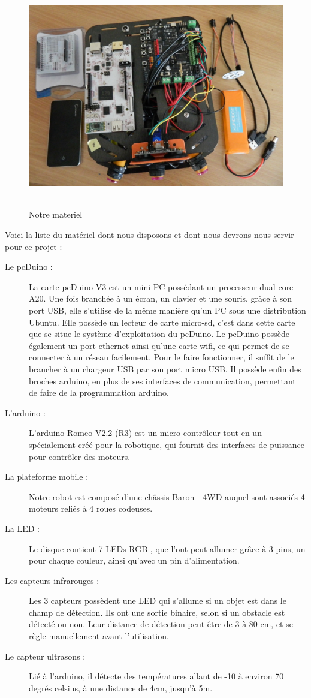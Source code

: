 \documentclass[12pt,francais]{report}
\begin{document}
\begin{figure}[!h]
\includegraphics[scale=0.4]{./images/notre_materiel.jpg}~\
\caption{Notre materiel}
\end{figure}
	
Voici la liste du matériel dont nous disposons et dont nous devrons nous servir pour ce projet :

\begin{description}
\item [Le pcDuino :] La carte pcDuino V3 est un mini PC possédant un processeur dual core A20. Une fois branchée à un écran, un clavier et une souris, grâce à son port USB, elle s'utilise de la même manière qu'un PC sous une distribution Ubuntu. Elle possède un lecteur de carte micro-sd,  c'est dans cette carte que se situe le système d'exploitation du pcDuino. Le pcDuino possède également un port ethernet ainsi qu'une carte wifi, ce qui permet de se connecter à un réseau facilement. Pour le faire fonctionner, il suffit de le brancher à un chargeur USB par son port micro USB. Il possède enfin des broches arduino, en plus de ses interfaces de communication, permettant de faire de la programmation arduino.\cite{ref3}
\item [L'arduino :] L'arduino Romeo V2.2 (R3) \cite{ref4} est un micro-contrôleur tout en un spécialement créé pour la robotique, qui fournit des interfaces de puissance pour contrôler des moteurs.
\item [La plateforme mobile :] Notre robot est composé d'une châssis Baron - 4WD auquel sont associés 4 moteurs reliés à 4 roues codeuses. \cite{ref5}
\item [La LED :] Le disque contient 7 LEDs RGB \cite{ref6}, que l'ont peut allumer grâce à 3 pins, un pour chaque couleur, ainsi qu'avec un pin d'alimentation.
\item [Les capteurs infrarouges :] Les 3 capteurs possèdent une LED qui s'allume si un objet est dans le champ de détection. Ils ont une sortie binaire, selon si un obstacle est détecté ou non. Leur distance de détection peut être de 3 à 80 cm, et se règle manuellement avant l'utilisation. \cite{ref7}
\item [Le capteur ultrasons :] Lié à l'arduino, il détecte des températures allant de -10 à environ 70 degrés celsius, à une distance de 4cm, jusqu'à 5m. \cite{ref8}
\end{description}
\end{document}
